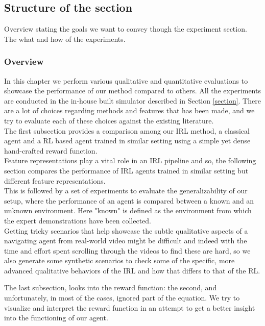 \subsection{Structure of the section}
Overview stating the goals we want to convey though the experiment section. The what and how of the experiments.
\subsubsection*{Overview}
In this chapter we perform various qualitative and quantitative evaluations to showcase the performance of our method compared to others. All the experiments are conducted in the in-house built simulator described in Section \ref{section}. There are a lot of choices regarding methods and features that has been made, and we try to evaluate each of these choices against the existing literature.\\
The first subsection provides a comparison among our IRL method, a classical agent and a RL based agent trained in similar setting using a simple yet dense hand-crafted reward function.\\
 Feature representations play a vital role in an IRL pipeline and so, the following section compares the performance of IRL agents trained in similar setting but different feature representations.\\
This is followed by a set of experiments to evaluate the generalizability of our setup, where the performance of an agent is compared between a known and an unknown environment. Here "known" is defined as the environment from which the expert demonstrations have been collected.\\

Getting tricky scenarios that help showcase the subtle qualitative aspects of a navigating agent from real-world video might be difficult and indeed with the time and effort spent scrolling through the videos to find these are hard, so we also generate some synthetic scenarios to check some of the specific, more advanced qualitative behaviors of the IRL and how that differs to that of the RL.

The last subsection, looks into the reward function: the second, and unfortunately, in most of the cases, ignored part of the equation. We try to visualize and interpret the reward function in an attempt to get a better insight into the functioning of our agent.

